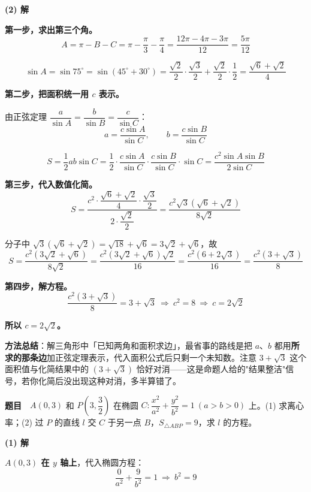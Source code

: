 \textbf{(2) 解}

\textbf{第一步，求出第三个角。}
\[A=\pi-B-C=\pi-\frac\pi3-\frac\pi4=\frac{12\pi-4\pi-3\pi}{12}=\frac{5\pi}{12}\]

\[\sin A=\sin75^{\circ}=\sin\left(45^{\circ}+30^{\circ}\right)=\frac{\sqrt2}2\cdot\frac{\sqrt3}2+\frac{\sqrt2}2\cdot\frac12=\frac{\sqrt6+\sqrt2}4\]

\textbf{第二步，把面积统一用 $c$ 表示。}

由正弦定理 $\dfrac a{\sin A}=\dfrac b{\sin B}=\dfrac c{\sin C}$：
\[a=\frac{c\sin A}{\sin C},\qquad b=\frac{c\sin B}{\sin C}\]

\[S=\frac12ab\sin C=\frac12\cdot\frac{c\sin A}{\sin C}\cdot\frac{c\sin B}{\sin C}\cdot\sin C=\frac{c^{2}\sin A\sin B}{2\sin C}\]

\textbf{第三步，代入数值化简。}
\[S=\frac{c^{2}\cdot\dfrac{\sqrt6+\sqrt2}4\cdot\dfrac{\sqrt3}2}{2\cdot\dfrac{\sqrt2}2}=\frac{c^{2}\sqrt3\left(\sqrt6+\sqrt2\right)}{8\sqrt2}\]

分子中 $\sqrt3\left(\sqrt6+\sqrt2\right)=\sqrt{18}+\sqrt6=3\sqrt2+\sqrt6$，故
\[S=\frac{c^{2}\left(3\sqrt2+\sqrt6\right)}{8\sqrt2}=\frac{c^{2}\left(3\sqrt2+\sqrt6\right)\sqrt2}{16}=\frac{c^{2}\left(6+2\sqrt3\right)}{16}=\frac{c^{2}\left(3+\sqrt3\right)}8\]

\textbf{第四步，解方程。}
\[\frac{c^{2}\left(3+\sqrt3\right)}8=3+\sqrt3\ \Longrightarrow\ c^{2}=8\ \Longrightarrow\ c=2\sqrt2\]

\textbf{所以 $c=2\sqrt2$。}

\begin{gktip}
\textbf{方法总结}：解三角形中「已知两角和面积求边」，最省事的路线是把 $a$、$b$ 都用\textbf{所求的那条边}加正弦定理表示，代入面积公式后只剩一个未知数。注意 $3+\sqrt3$ 这个面积值与化简结果中的 $\left(3+\sqrt3\right)$ 恰好对消——这是命题人给的"结果整洁"信号，若你化简后没出现这种对消，多半算错了。
\end{gktip}

\par\medskip


\textbf{题目}　$A(0,3)$ 和 $P\left(3,\dfrac32\right)$ 在椭圆 $C:\dfrac{x^{2}}{a^{2}}+\dfrac{y^{2}}{b^{2}}=1\ (a>b>0)$ 上。(1) 求离心率；(2) 过 $P$ 的直线 $l$ 交 $C$ 于另一点 $B$，$S_{\triangle ABP}=9$，求 $l$ 的方程。

\par\medskip

\textbf{(1) 解}

\textbf{$A(0,3)$ 在 $y$ 轴上}，代入椭圆方程：
\[\frac{0}{a^{2}}+\frac{9}{b^{2}}=1\ \Longrightarrow\ b^{2}=9\]

